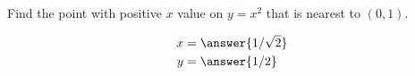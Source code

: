 \documentclass{ximera}
\author{Bart Snapp}
\begin{document}
\begin{exercise}

  Find the point with positive $x$ value on $y=x^2$ that is nearest to
  $(0,1)$.
  \begin{prompt}
  \begin{align*}
  x &= \answer{1/\sqrt{2}}\\
  y &= \answer{1/2}
  \end{align*}
  \end{prompt}
\end{exercise}
\end{document}
